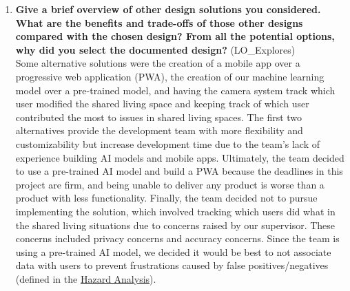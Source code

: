 \documentclass[12pt, titlepage]{article}
\begin{document}
\begin{enumerate}
  \item \textbf{Give a brief overview of other design solutions you considered.  What
  are the benefits and trade-offs of those other designs compared with the chosen
  design?  From all the potential options, why did you select the documented design?}
  (LO\_Explores)\\
  Some alternative solutions were the creation of a mobile app over a progressive web application (PWA), the creation of our machine learning model over a pre-trained model, and having the camera system track which user modified the shared living space and keeping track of which user contributed the most to issues in shared living spaces. The first two alternatives provide the development team with more flexibility and customizability but increase development time due to the team's lack of experience building AI models and mobile apps. Ultimately, the team decided to use a pre-trained AI model and build a PWA because the deadlines in this project are firm, and being unable to deliver any product is worse than a product with less functionality. Finally, the team decided not to pursue implementing the solution, which involved tracking which users did what in the shared living situations due to concerns raised by our supervisor. These concerns included privacy concerns and accuracy concerns. Since the team is using a pre-trained AI model, we decided it would be best to not associate data with users to prevent frustrations caused by false positives/negatives (defined in the \href{https://github.com/jinalkast/room8/tree/main/docs/HazardAnalysis}{Hazard Analysis}).
\end{enumerate}
\end{document}
